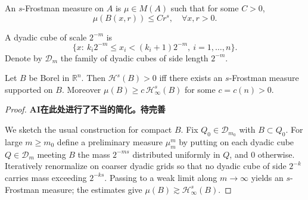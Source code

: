     \begin{definition}
    An $s$-Frostman measure on $A$ is $\mu\in M(A)$ such that for some $C>0$,
        \begin{equation*}
            \mu(B(x,r))\leq C r^{s},\quad\forall x,r>0.
        \end{equation*}
    \end{definition}

    \begin{definition}
    A dyadic cube of scale $2^{-m}$ is
        \begin{equation*}
            \{x:\ k_{i}2^{-m}\le x_{i}<(k_{i}+1)2^{-m},\ i=1,\dots,n\}.
        \end{equation*}
    Denote by $\mathscr{D}_{m}$ the family of dyadic cubes of side length $2^{-m}$.
    \end{definition}

    \begin{theorem}
    \label{thm:frostman}
    Let $B$ be Borel in $\mathbb{R}^{n}$. Then $\mathcal{H}^{s}(B)>0$ iff there exists an $s$-Frostman measure supported on $B$. Moreover $\mu(B)\ge c\,\mathcal{H}^{s}_{\infty}(B)$ for some $c=c(n)>0$.
    \end{theorem}

    \begin{proof}
        \textbf{AI在此处进行了不当的简化。待完善}

        We sketch the usual construction for compact $B$. Fix $Q_{0}\in\mathscr{D}_{m_{0}}$ with $B\subset Q_{0}$. For large $m\ge m_{0}$ define a preliminary measure $\mu_{m}^{m}$ by putting on each dyadic cube $Q\in\mathscr{D}_{m}$ meeting $B$ the mass $2^{-ms}$ distributed uniformly in $Q$, and $0$ otherwise. Iteratively renormalize on coarser dyadic grids so that no dyadic cube of side $2^{-k}$ carries mass exceeding $2^{-ks}$. Passing to a weak limit along $m\to\infty$ yields an $s$-Frostman measure; the estimates give $\mu(B)\gtrsim \mathcal{H}^{s}_{\infty}(B)$.
    \end{proof}